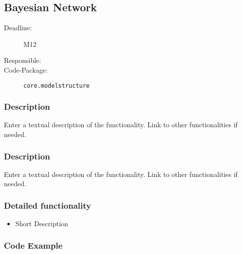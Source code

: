 \newpage
\subsection{Bayesian Network}
\label{BNs:ID}

\begin{description}
\item[Deadline:] M12
\item[Responsible:] 
\item[Code-Package:] \texttt{core.modelstructure}
\end{description}

\subsubsection*{Description}

Enter a textual description of the functionality. Link to other functionalities if needed. 

\subsubsection*{Description}

Enter a textual description of the functionality. Link to other functionalities if needed. 

\subsubsection*{Detailed functionality}

\begin{itemize}
\item Short Description
\end{itemize}

\subsubsection*{Code Example}
